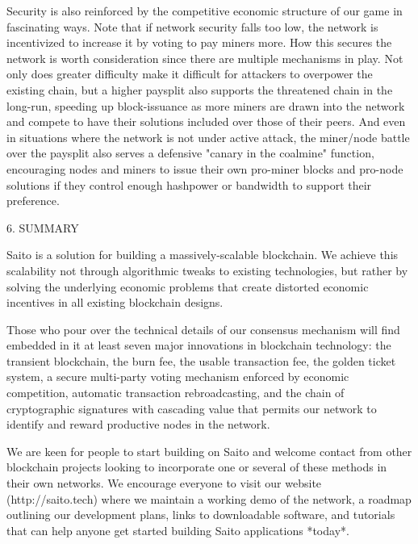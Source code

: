 \documentclass[11.5pt, oneside]{article}   	%
\begin{document}
\begin{multicols}{2}
Security is also reinforced by the competitive economic structure of our game in fascinating ways. Note that if network security falls too low, the network is incentivized to increase it by voting to pay miners more. How this secures the network is worth consideration since there are multiple mechanisms in play. Not only does greater difficulty make it difficult for attackers to overpower the existing chain, but a higher paysplit also supports the threatened chain in the long-run, speeding up block-issuance as more miners are drawn into the network and compete to have their solutions included over those of their peers. And even in situations where the network is not under active attack, the miner/node battle over the paysplit also serves a defensive "canary in the coalmine" function, encouraging nodes and miners to issue their own pro-miner blocks and pro-node solutions if they control enough hashpower or bandwidth to support their preference.

6. SUMMARY

Saito is a solution for building a massively-scalable blockchain. We achieve this scalability not through algorithmic tweaks to existing technologies, but rather by solving the underlying economic problems that create distorted economic incentives in all existing blockchain designs.

Those who pour over the technical details of our consensus mechanism will find embedded in it at least seven major innovations in blockchain technology: the transient blockchain, the burn fee, the usable transaction fee, the golden ticket system, a secure multi-party voting mechanism enforced by economic competition, automatic transaction rebroadcasting, and the chain of cryptographic signatures with cascading value that permits our network to identify and reward productive nodes in the network.  

We are keen for people to start building on Saito and welcome contact from other blockchain projects looking to incorporate one or several of these methods in their own networks. We encourage everyone to visit our website (http://saito.tech) where we maintain a working demo of the network, a roadmap outlining our development plans, links to downloadable software, and tutorials that can help anyone get started building Saito applications *today*.

\end{multicols} 
\end{document}
